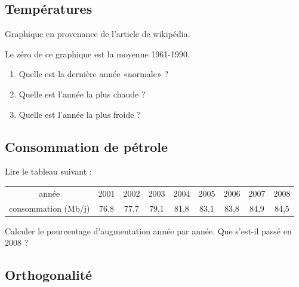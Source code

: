 \subsection{Températures}

Graphique en provenance de l'article  de wikipédia.

Le zéro de ce graphique est la moyenne 1961-1990.

\begin{enumerate}
    \item
        Quelle est la dernière année «normale» ?
    \item
        Quelle est l'année la plus chaude ?
    \item
        Quelle est l'année la plus froide ?
\end{enumerate}

\subsection{Consommation de pétrole}

Lire le tableau suivant :
\begin{center}
\begin{tabular}[h]{|c|c|c|c|c|c|c|c|c|}
année&
2001&
2002&
2003&
2004&
2005&
2006&
2007&
2008\\
consommation (Mb/j)&
76,8&
77,7&
79,1&
81,8&
83,1&
83,8&
84,9&
84,5
\end{tabular}
\end{center}

Calculer le pourcentage d'augmentation année par année. Que s'est-il passé en 2008 ?


\subsection{Orthogonalité}

